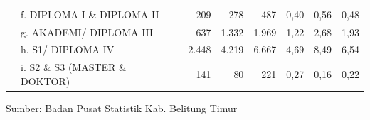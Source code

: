 {\begin{tabular}{rY{25em}rrrrrr}
      & f. DIPLOMA I \& DIPLOMA II                         &    209 &    278 &     487 &  0,40 &  0,56 &  0,48 \\
      & g. AKADEMI/ DIPLOMA III                            &    637 &  1.332 &   1.969 &  1,22 &  2,68 &  1,93 \\
      & h. S1/ DIPLOMA IV                                  &  2.448 &  4.219 &   6.667 &  4,69 &  8,49 &  6,54 \\
      & i. S2 \& S3 (MASTER \& DOKTOR)                     &    141 &     80 &     221 &  0,27 &  0,16 &  0,22 \\
    \bottomrule
\end{tabular}%

}

\vfill
Sumber: Badan Pusat Statistik Kab. Belitung Timur\par 
